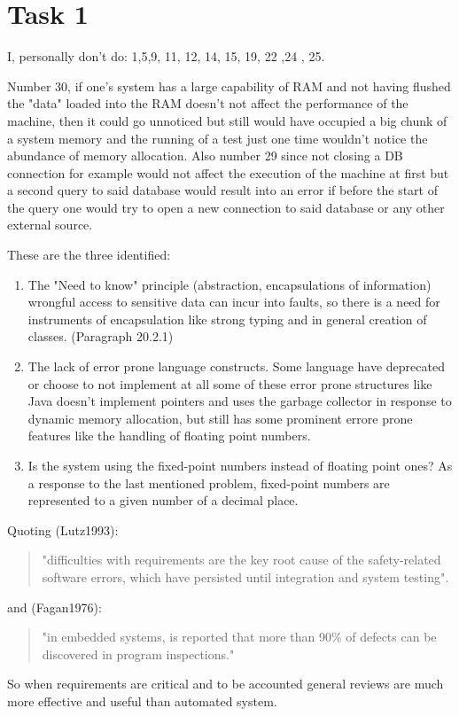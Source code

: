 \chapter{Task 1}
\begin{parlist}
	\item I, personally don't do: 1,5,9, 11, 12, 14, 15, 19, 22 ,24 , 25.
	\item 
	\item Number 30, if one's system has a large capability of RAM and not having flushed the "data" loaded into the RAM doesn't not affect the performance of the machine, then it could go unnoticed but still would have occupied a big chunk of a system memory and the running of a test just one time wouldn't notice the abundance of memory allocation. Also number 29 since not closing a DB connection for example would not affect the execution of the machine at first but a second query to said database would result into an error if before the start of the query one would try to open a new connection to said database or any other external source.
	\item These are the three identified:
		\begin{enumerate}
			\item The "Need to know" principle (abstraction, encapsulations of information) wrongful access to sensitive data can incur into faults, so there is a need for instruments of encapsulation like strong typing and in general creation of classes. \cite{Sommerville2004}(Paragraph 20.2.1)
			\item The lack of error prone language constructs. Some language have deprecated or choose to not implement at all some of these error prone structures like Java doesn't implement pointers and uses the garbage collector in response to dynamic memory allocation, but still has some prominent errore prone features like the handling of floating point numbers. \cite{Sommerville2004}
			\item Is the system using the fixed-point numbers instead of floating point ones? As a response to the last mentioned problem, fixed-point numbers are represented to a given number of a decimal place. \cite{Sommerville2004}
		\end{enumerate}
 \newpage
	\item Quoting (Lutz1993)\cite{Lutz1993}:\begin{quotation}
			"difficulties with requirements are the key root cause of the safety-related software errors, which have persisted until integration and system testing".\end{quotation}
			and (Fagan1976)\cite{Fagan2002}:\begin{quotation}
		"in embedded systems, is reported that more than 90\% of defects can be discovered in program inspections."
			\end{quotation}
		 So when requirements are critical and to be accounted general reviews are much more effective and useful than automated system. \\
		

\end{parlist}
